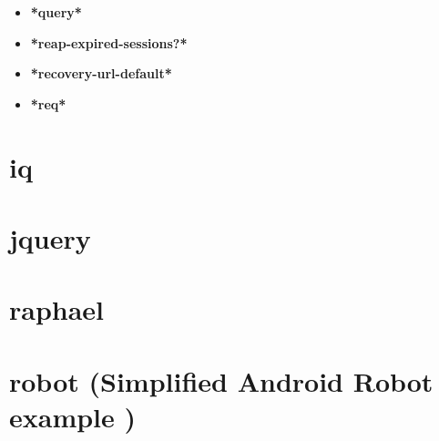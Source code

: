 \documentclass [11pt]{book}
\begin{document}
\begin{itemize}
\item {}
\label{prim:*query*}
\textbf{*query*}





\item {}
\label{prim:*reap-expired-sessions?*}
\textbf{*reap-expired-sessions?*}





\item {}
\label{prim:*recovery-url-default*}
\textbf{*recovery-url-default*}





\item {}
\label{prim:*req*}
\textbf{*req*}





\end{itemize}





\section{iq }

\label{sec:iq}







\section{jquery }

\label{sec:jquery}







\section{raphael }

\label{sec:raphael}







\section{robot (Simplified Android Robot example )}
\end{document}
